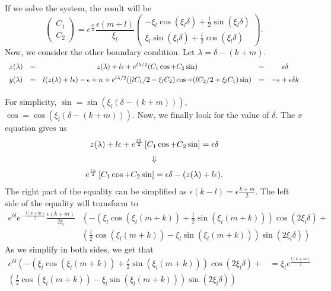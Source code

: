 \documentclass[a4paper,preprint,11pt]{article}
\begin{document}
If we solve the system, the result will be
$$
\begin{pmatrix}
C_1 \\ 
C_2
\end{pmatrix} 
= e^{\frac{l\delta}{2}}\frac{\epsilon(m+l)}{\xi_l}
\begin{pmatrix}
-\xi_l\cos(\xi_l\delta)+\frac{l}{2}\sin(\xi_l\delta) \\
\xi_l\sin(\xi_l\delta)+\frac{l}{2}\cos(\xi_l\delta)
\end{pmatrix}.
$$
Now, we consider the other boundary condition. Let $\lambda=\delta-(k+m)$.
$$
\begin{array}{ccccc}
x(\lambda) & = & z(\lambda)+l\epsilon+e^{l\lambda/2}(C_1\cos+C_2\sin) & = & \epsilon\delta \vspace{0.2cm}\\
y(\lambda) & = & l(z(\lambda)+l\epsilon)-\epsilon+n+ e^{l\lambda/2}((lC_1/2-\xi_lC_2)\cos+(lC_2/2+\xi_lC_1)\sin) & = & -\epsilon+\epsilon\delta k \vspace{0.3cm} \\ %
\end{array}
$$
For simplicity, $\sin=\sin(\xi_l(\delta-(k+m)))$, $\cos=\cos(\xi_l(\delta-(k+m)))$. Now, we finally look for the value of $\delta$. The $x$ equation gives us
$$
\begin{array}{c}
z(\lambda) + l\epsilon + e^{\frac{l\lambda}{2}}\left[C_1\cos + C_2\sin \right] = \epsilon\delta \vspace{0.2cm}\\
\Downarrow \vspace{0.2cm}\\
e^{\frac{l\lambda}{2}}\left[C_1\cos + C_2\sin \right] = \epsilon\delta - (z(\lambda) + l\epsilon ).
\end{array}
$$
The right part of the equality can be simplified as $\epsilon(k-l)=\epsilon\frac{k+m}{2}$. The left side of the equality will transform to
\begin{align*}
e^{l\delta}e^{-\frac{l(k+m)}{2}}\frac{\epsilon(k+m)}{2\xi_l}
& \left(
-(\xi_l\cos(\xi_l(m+k))+\frac{l}{2}\sin(\xi_l(m+k)))\cos(2\xi_l\delta) + \right. \\
&
\left. (\frac{l}{2}\cos(\xi_l(m+k))-\xi_l\sin(\xi_l(m+k)))\sin(2\xi_l\delta)
\right)
\end{align*}
As we simplify in both sides, we get that
$$
\begin{array}{rl}
e^{l\delta} \left(
-(\xi_l\cos(\xi_l(m+k))+\frac{l}{2}\sin(\xi_l(m+k)))\cos(2\xi_l\delta) + \right. 
& = \xi_le^{\frac{l(k+m)}{2}} \\
\left. (\frac{l}{2}\cos(\xi_l(m+k))-\xi_l\sin(\xi_l(m+k)))\sin(2\xi_l\delta)
\right)
\end{array}
$$
\end{document}
